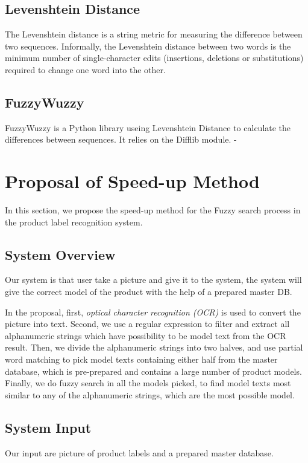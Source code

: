 \documentclass[technicalreport]{ieicej}
\begin{document}
    \subsection{Levenshtein Distance}
        The Levenshtein distance is a string metric for measuring the difference between two sequences. Informally, the Levenshtein distance between two words is the minimum number of single-character edits (insertions, deletions or substitutions) required to change one word into the other. \cite{levenshtein}

    \subsection{FuzzyWuzzy}
        FuzzyWuzzy is a Python library useing Levenshtein Distance to calculate the differences between sequences. It relies on the Difflib module. \cite{fuzzywuzzy}-\cite{fuzzywuzzy-git}


\section{Proposal of Speed-up Method}
\label{sec:algorithm}
    In this section, we propose the speed-up method for the Fuzzy search process in the product label recognition system.

    \subsection{System Overview}
        Our system is that user take a picture and give it to the system, the system will give the correct model of the product with the help of a prepared master DB.

        In the proposal, first, {\em optical character recognition (OCR)} is used to convert the picture into text. Second, we use a regular expression to filter and extract all alphanumeric strings which have possibility to be model text from the OCR result. Then, we divide the alphanumeric strings into two halves, and use partial word matching to pick model texts containing either half from the master database, which is pre-prepared and contains a large number of product models. Finally, we do fuzzy search in all the models picked, to find model texts most similar to any of the alphanumeric strings, which are the most possible model. 
        
    \subsection{System Input}
    \label{sec:algorithm.ocrregex}
        Our input are picture of product labels and a prepared master database.
\end{document}
